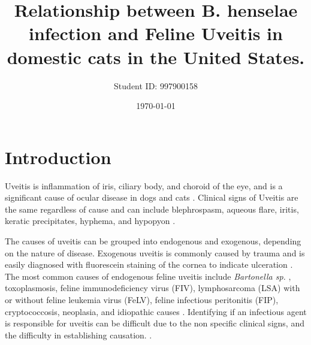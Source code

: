 \documentclass[11pt,twocolumn]{article}
\title{Relationship between B. henselae infection and Feline Uveitis in domestic cats in the United States.}
\author{Student ID: 997900158}
\date{\today}
\begin{document}

	\section{Introduction} 
		Uveitis is inflammation of iris, ciliary body, and choroid of the eye, and is a significant cause of ocular disease in dogs and cats \cite{Townsend2008}. 
		Clinical signs of Uveitis are the same regardless of cause and can include blephrospasm, aqueous flare, iritis, keratic precipitates, hyphema, and hypopyon \cite{Powell2010}.


		The causes of uveitis can be grouped into endogenous and exogenous, depending on the nature of disease. Exogenous uveitis is commonly caused by trauma and is easily diagnosed with fluorescein staining of the cornea to indicate ulceration \cite{Fontenelle2008}.
		The most common causes of endogenous feline uveitis include \emph{Bartonella sp.} , toxoplasmosis, feline immunodeficiency virus (FIV), lymphosarcoma (LSA) with or without feline leukemia virus (FeLV), feline infectious peritonitis (FIP), cryptococcosis, neoplasia, and idiopathic causes \cite{Powell2001}.
		Identifying if an infectious agent is responsible for uveitis can be difficult due to the non specific clinical signs, and the difficulty in establishing causation. \cite{Fontenelle2008}.
\end{document}
